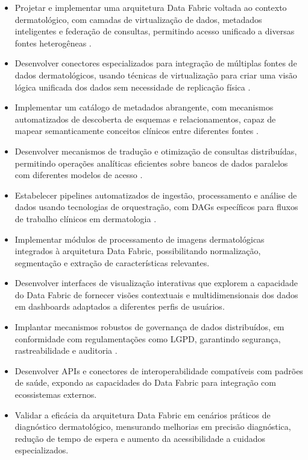 \begin{itemize}
\item Projetar e implementar uma arquitetura Data Fabric voltada ao contexto dermatológico, com camadas de virtualização de dados, metadados inteligentes e federação de consultas, permitindo acesso unificado a diversas fontes heterogêneas \cite{sharma2023data}.

\item Desenvolver conectores especializados para integração de múltiplas fontes de dados dermatológicos, usando técnicas de virtualização para criar uma visão lógica unificada dos dados sem necessidade de replicação física \cite{lee2024delta}.

\item Implementar um catálogo de metadados abrangente, com mecanismos automatizados de descoberta de esquemas e relacionamentos, capaz de mapear semanticamente conceitos clínicos entre diferentes fontes \cite{sharma2023data,lee2024delta}.

\item Desenvolver mecanismos de tradução e otimização de consultas distribuídas, permitindo operações analíticas eficientes sobre bancos de dados paralelos com diferentes modelos de acesso \cite{sharma2023data}.

\item Estabelecer pipelines automatizados de ingestão, processamento e análise de dados usando tecnologias de orquestração, com DAGs específicos para fluxos de trabalho clínicos em dermatologia \cite{lee2024delta}.

\item Implementar módulos de processamento de imagens dermatológicas integrados à arquitetura Data Fabric, possibilitando normalização, segmentação e extração de características relevantes.

\item Desenvolver interfaces de visualização interativas que explorem a capacidade do Data Fabric de fornecer visões contextuais e multidimensionais dos dados em dashboards adaptados a diferentes perfis de usuários.

\item Implantar mecanismos robustos de governança de dados distribuídos, em conformidade com regulamentações como LGPD, garantindo segurança, rastreabilidade e auditoria \cite{benfeldt2020data}.

\item Desenvolver APIs e conectores de interoperabilidade compatíveis com padrões de saúde, expondo as capacidades do Data Fabric para integração com ecossistemas externos.

\item Validar a eficácia da arquitetura Data Fabric em cenários práticos de diagnóstico dermatológico, mensurando melhorias em precisão diagnóstica, redução de tempo de espera e aumento da acessibilidade a cuidados especializados.
\end{itemize}
